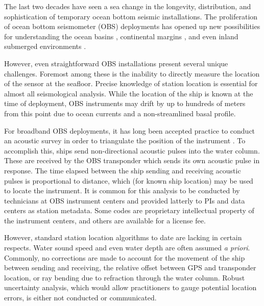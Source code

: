 The last two decades have seen a sea change in the longevity, distribution, and sophistication of temporary ocean bottom seismic installations. The proliferation of ocean bottom seismometer (OBS) deployments has opened up new possibilities for understanding the ocean basins \citep[e.g.][]{Lin2016,Takeo2016}, continental margins \citep[e.g.][]{Janiszewski2015,Hawley2016,Lynner2017,Eilon2017}, and even inland submerged environments \citep[e.g.][]{Accardo2017}. 

However, even straightforward OBS installations present several unique challenges. Foremost among these is the inability to directly measure the location of the sensor at the seafloor. Precise knowledge of station location is essential for almost all seismological analysis. While the location of the ship is known at the time of deployment, OBS instruments may drift by up to hundreds of meters from this point due to ocean currents and a non-streamlined basal profile. 

For broadband OBS deployments, it has long been accepted practice to conduct an acoustic survey in order to triangulate the position of the instrument \citep[i.e.,][]{Creager1982}. To accomplish this, ships send non-directional acoustic pulses into the water column. These are received by the OBS transponder which sends its own acoustic pulse in response. The time elapsed between the ship sending and receiving acoustic pulses is proportional to distance, which (for known ship location) may be used to locate the instrument. It is common for this analysis to be conducted by technicians at OBS instrument centers and provided latterly to PIs and data centers as station metadata. Some codes are proprietary intellectual property of the instrument centers, and others are available for a license fee. 

However, standard station location algorithms to date are lacking in certain respects. Water sound speed and even water depth are often assumed \textit{a priori}. Commonly, no corrections are made to account for the movement of the ship between sending and receiving, the relative offset between GPS and transponder location, or ray bending due to refraction through the water column. Robust uncertainty analysis, which would allow practitioners to gauge potential location errors, is either not conducted or communicated.

